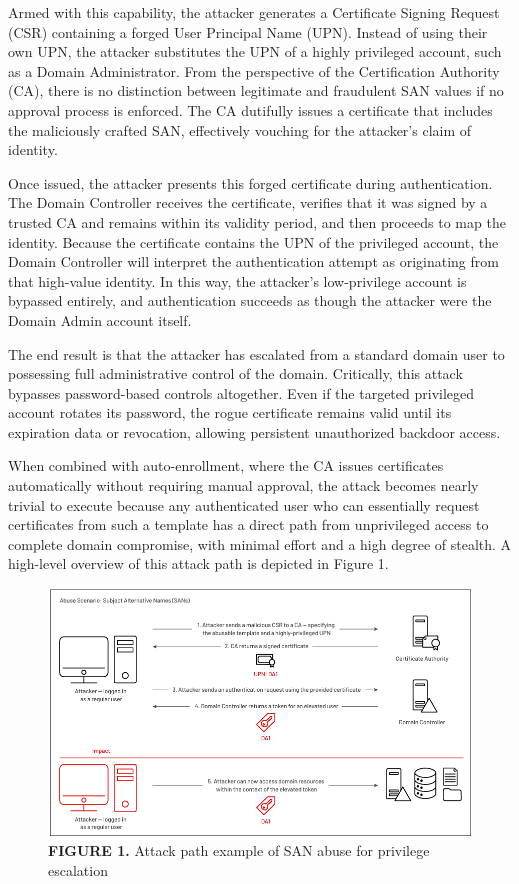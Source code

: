 {Armed with this capability, the attacker generates a Certificate Signing Request (CSR) containing a forged User Principal Name (UPN). Instead of using their own UPN, the attacker substitutes the UPN of a highly privileged account, such as a Domain Administrator. From the perspective of the Certification Authority (CA), there is no distinction between legitimate and fraudulent SAN values if no approval process is enforced. The CA dutifully issues a certificate that includes the maliciously crafted SAN, effectively vouching for the attacker's claim of identity.

Once issued, the attacker presents this forged certificate during authentication. The Domain Controller receives the certificate, verifies that it was signed by a trusted CA and remains within its validity period, and then proceeds to map the identity. Because the certificate contains the UPN of the privileged account, the Domain Controller will interpret the authentication attempt as originating from that high-value identity. In this way, the attacker's low-privilege account is bypassed entirely, and authentication succeeds as though the attacker were the Domain Admin account itself.

The end result is that the attacker has escalated from a standard domain user to possessing full administrative control of the domain. Critically, this attack bypasses password-based controls altogether. Even if the targeted privileged account rotates its password, the rogue certificate remains valid until its expiration data or revocation, allowing persistent unauthorized backdoor access.

When combined with auto-enrollment, where the CA issues certificates automatically without requiring manual approval, the attack becomes nearly trivial to execute because any authenticated user who can essentially request certificates from such a template has a direct path from unprivileged access to complete domain compromise, with minimal effort and a high degree of stealth.
A high-level overview of this attack path is depicted in Figure 1.
\begin{figure}
    \centering
    \includegraphics[width=0.75\linewidth]{sanattack.png}
    \caption{\textbf{FIGURE 1.} Attack path example of SAN abuse for privilege escalation}
    \label{fig:placeholder}
\end{figure}

}

